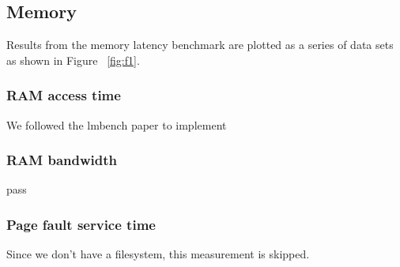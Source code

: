 \subsection{Memory}
Results from the memory latency benchmark are
plotted as a series of data sets as shown in Figure 
~\ref{fig:f1}.

\subsubsection{RAM access time}
We followed the lmbench paper to implement 
\subsubsection{RAM bandwidth}
pass
\subsubsection{Page fault service time}
Since we don't have a filesystem, this measurement is skipped.